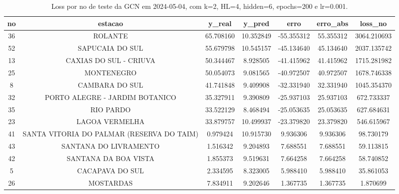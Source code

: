 \begin{table}[h]
\centering
\caption{Loss por no de teste da GCN em 2024-05-04, com k=2, HL=4, hidden=6, epochs=200 e lr=0.001.}
\label{tab:gcn_loss_k2_hl4_h6_e200_d20240504}
\begin{tabular}{ccccccc}
\toprule
no & estacao & y\_real & y\_pred & erro & erro\_abs & loss\_no \\
\midrule
36 & ROLANTE & 65.708160 & 10.352849 & -55.355312 & 55.355312 & 3064.210693 \\
52 & SAPUCAIA DO SUL & 55.679798 & 10.545157 & -45.134640 & 45.134640 & 2037.135742 \\
13 & CAXIAS DO SUL - CRIUVA & 50.344467 & 8.928505 & -41.415962 & 41.415962 & 1715.281982 \\
25 & MONTENEGRO & 50.054073 & 9.081565 & -40.972507 & 40.972507 & 1678.746338 \\
8 & CAMBARA DO SUL & 41.741848 & 9.409908 & -32.331940 & 32.331940 & 1045.354370 \\
32 & PORTO ALEGRE - JARDIM BOTANICO & 35.327911 & 9.390809 & -25.937103 & 25.937103 & 672.733337 \\
35 & RIO PARDO & 33.522129 & 8.468494 & -25.053635 & 25.053635 & 627.684631 \\
23 & LAGOA VERMELHA & 33.879757 & 10.499937 & -23.379820 & 23.379820 & 546.615967 \\
41 & SANTA VITORIA DO PALMAR (RESERVA DO TAIM) & 0.979424 & 10.915730 & 9.936306 & 9.936306 & 98.730179 \\
43 & SANTANA DO LIVRAMENTO & 1.516342 & 9.204893 & 7.688551 & 7.688551 & 59.113815 \\
42 & SANTANA DA BOA VISTA & 1.855373 & 9.519631 & 7.664258 & 7.664258 & 58.740852 \\
5 & CACAPAVA DO SUL & 2.334595 & 8.323005 & 5.988410 & 5.988410 & 35.861053 \\
26 & MOSTARDAS & 7.834911 & 9.202646 & 1.367735 & 1.367735 & 1.870699 \\
\bottomrule
\end{tabular}
\end{table}
